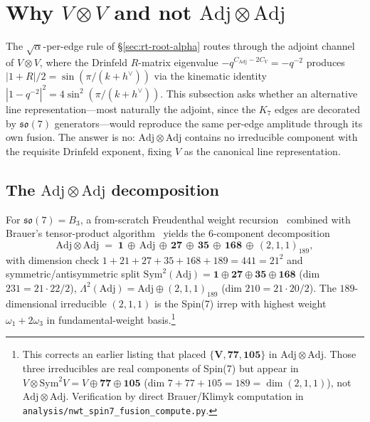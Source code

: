 \documentclass[11pt]{article}
\newcommand{\so}{\mathfrak{so}}
\newcommand{\Adj}{\mathrm{Adj}}
\newcommand{\Sym}{\mathrm{Sym}}
\newcommand{\hv}{h^{\vee}}
\begin{document}
\section{Why $V\otimes V$ and not $\Adj\otimes \Adj$}
\label{sec:channel-robust}

The $\sqrt{\alpha}$-per-edge rule of \S\ref{sec:rt-root-alpha}
routes through the adjoint channel of $V \otimes V$, where the
Drinfeld $R$-matrix eigenvalue $-q^{C_\Adj - 2 C_V} = -q^{-2}$
produces $|1 + R|/2 = \sin(\pi/(k+\hv))$ via the kinematic identity
$|1 - q^{-2}|^2 = 4 \sin^2(\pi/(k+\hv))$.  This subsection asks
whether an alternative line representation---most naturally the
adjoint, since the $K_7$ edges are decorated by $\so(7)$
generators---would reproduce the same per-edge amplitude through
its own fusion.  The answer is no: $\Adj \otimes \Adj$ contains no
irreducible component with the requisite Drinfeld exponent, fixing
$V$ as the canonical line representation.

\subsection{The $\Adj \otimes \Adj$ decomposition}
\label{sec:adj-adj-decomp}

For $\so(7) = B_3$, a from-scratch Freudenthal weight
recursion~\cite{freudenthal1954} combined with Brauer's
tensor-product algorithm~\cite{brauer1937} yields the
6-component decomposition
\begin{equation}
  \Adj \otimes \Adj
  \;=\; \mathbf{1} \,\oplus\, \Adj \,\oplus\, \mathbf{27}
       \,\oplus\, \mathbf{35} \,\oplus\, \mathbf{168}
       \,\oplus\, (2,1,1)_{189},
  \label{eq:adj-adj-decomp}
\end{equation}
with dimension check $1 + 21 + 27 + 35 + 168 + 189 = 441 = 21^2$
and symmetric/antisymmetric split
$\Sym^2(\Adj) = \mathbf{1} \oplus \mathbf{27} \oplus \mathbf{35}
\oplus \mathbf{168}$ (dim $231 = 21 \cdot 22 / 2$),
$\Lambda^2(\Adj) = \Adj \oplus (2,1,1)_{189}$
(dim $210 = 21 \cdot 20 / 2$).  The $189$-dimensional irreducible
$(2,1,1)$ is the Spin(7) irrep with highest weight $\omega_1
+ 2 \omega_3$ in fundamental-weight basis.\footnote{This corrects
an earlier listing that placed
$\{\mathbf{V}, \mathbf{77}, \mathbf{105}\}$ in
$\Adj \otimes \Adj$.  Those three irreducibles are real components
of Spin(7) but appear in $V \otimes \Sym^2 V = V \oplus \mathbf{77}
\oplus \mathbf{105}$ (dim $7 + 77 + 105 = 189 = \dim(2,1,1)$),
not $\Adj \otimes \Adj$.  Verification by direct Brauer/Klimyk
computation in \texttt{analysis/nwt\_spin7\_fusion\_compute.py}.}
\end{document}
